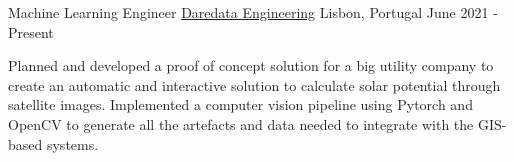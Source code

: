 

\begin{cventries}

  \cventry
    {Machine Learning Engineer} %
    {\href{https://daredata.engineering/home}{Daredata Engineering}} %
    {Lisbon, Portugal} %
    {June 2021 - Present} %
    {
      \begin{cvitems} %
        \item {Planned and developed a proof of concept solution for a big utility company to create an automatic and interactive solution to calculate solar potential through satellite images. Implemented a computer vision pipeline using Pytorch and OpenCV to generate all the artefacts and data needed to integrate with the GIS-based systems.}
      \end{cvitems}
    }


\end{cventries}
